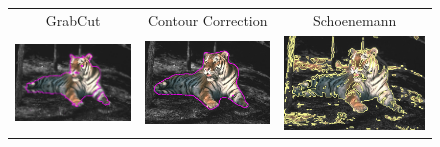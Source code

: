 \documentclass[runningheads]{llncs}
\begin{document}
\begin{figure}
	\center
	\begin{tabular}{ccc}
		GrabCut & Contour Correction & Schoenemann\\
		\includegraphics[scale=0.2]{images/segmentation/tiger1/gc-seg.png} &
		\includegraphics[scale=0.2]{images/segmentation/tiger1/corrected-seg.png} &					\includegraphics[scale=0.2]{images/segmentation/schoenemann/tiger1/tiger1-seg.png}\\									

\end{tabular}
\end{figure}
\end{document}
